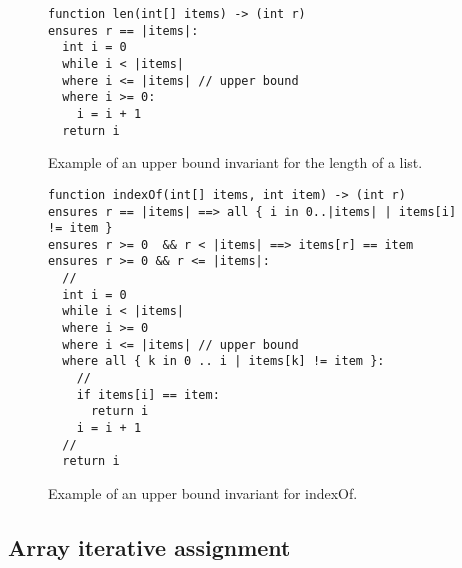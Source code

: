 \begin{figure}[ht]
\begin{lstlisting}
function len(int[] items) -> (int r)
ensures r == |items|:
  int i = 0
  while i < |items|
  where i <= |items| // upper bound
  where i >= 0:
    i = i + 1
  return i
\end{lstlisting}
\caption{Example of an upper bound invariant for the length of a list.}
\label{lst:upper-bound}
\end{figure}

\begin{figure}[ht]
\begin{lstlisting}
function indexOf(int[] items, int item) -> (int r)
ensures r == |items| ==> all { i in 0..|items| | items[i] != item }
ensures r >= 0  && r < |items| ==> items[r] == item
ensures r >= 0 && r <= |items|:
  //
  int i = 0
  while i < |items|
  where i >= 0
  where i <= |items| // upper bound
  where all { k in 0 .. i | items[k] != item }:
    //    
    if items[i] == item:
      return i
    i = i + 1
  //
  return i
\end{lstlisting}
\caption{Example of an upper bound invariant for indexOf.}
\label{lst:upper-bound-indexof}
\end{figure}

\subsection{Array iterative assignment}

